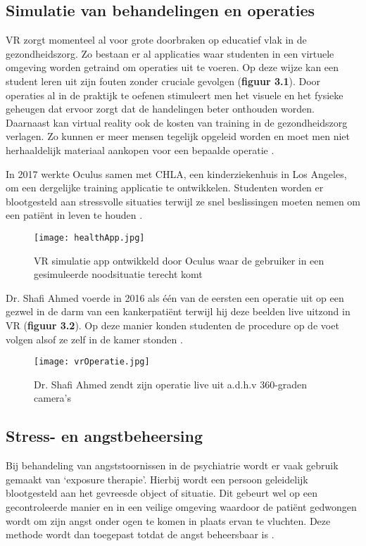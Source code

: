 \subsection{Simulatie van behandelingen en operaties}
VR zorgt momenteel al voor grote doorbraken op educatief vlak in de gezondheidszorg. Zo bestaan er al applicaties waar studenten in een virtuele omgeving worden getraind om operaties uit te voeren. Op deze wijze kan een student leren uit zijn fouten zonder cruciale gevolgen (\textbf{figuur 3.1}). Door operaties al in de praktijk te oefenen stimuleert men het visuele en het fysieke geheugen dat ervoor zorgt dat de handelingen beter onthouden worden. Daarnaast kan virtual reality ook de kosten van training in de gezondheidszorg verlagen. Zo kunnen er meer mensen tegelijk opgeleid worden en moet men niet herhaaldelijk materiaal aankopen voor een bepaalde operatie \autocite{Elion2018}.

In 2017 werkte Oculus samen met CHLA, een kinderziekenhuis in Los Angeles, om een dergelijke training applicatie te ontwikkelen. Studenten worden er blootgesteld aan stressvolle situaties terwijl ze snel beslissingen moeten nemen om een patiënt in leven te houden \autocite{Adobe2018}.

\begin{figure}[h]
    \centering
    \texttt{[image: healthApp.jpg]}
    \caption{VR simulatie app ontwikkeld door Oculus waar de gebruiker in een gesimuleerde noodsituatie terecht komt \autocite{Adobe2018}}
\end{figure}

Dr. Shafi Ahmed voerde in 2016  als één van de eersten een operatie uit op een gezwel in de darm van een kankerpatiënt terwijl hij deze beelden live uitzond in VR (\textbf{figuur 3.2}). Op deze manier konden studenten de procedure op de voet volgen alsof ze zelf in de kamer stonden \autocite{Pelta2017}.

\begin{figure}[h]
    \centering
    \texttt{[image: vrOperatie.jpg]}
    \caption{Dr. Shafi Ahmed zendt zijn operatie live uit a.d.h.v 360-graden camera's \autocite{Realities2019}}
\end{figure}

\subsection{Stress- en angstbeheersing}  
Bij behandeling van angststoornissen in de psychiatrie wordt er vaak gebruik gemaakt van ‘exposure therapie’. Hierbij wordt een persoon geleidelijk blootgesteld aan het gevreesde object of situatie. Dit gebeurt wel op een gecontroleerde manier en in een veilige omgeving waardoor de patiënt gedwongen wordt om zijn angst onder ogen te komen in plaats ervan te vluchten. Deze methode wordt dan toegepast totdat de angst beheersbaar is \autocite{Keller2018}. 

